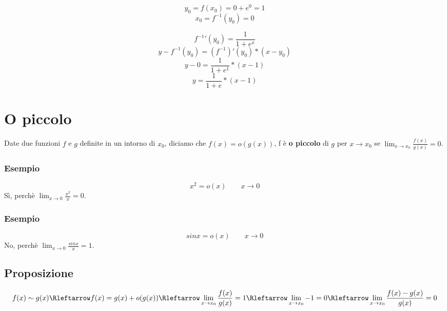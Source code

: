 \documentclass{article}
\begin{document}
\[y_0 = f(x_0) = 0 + e^0 = 1\]
\[x_0 = f^{-1}(y_0) = 0\]

\[f^{-1}'(y_0) = \frac{1}{1 + e^x}\]
\[y - f^{-1}(y_0) = (f^{-1})'(y_0) * (x - y_0)\]
\[y - 0 = \frac{1}{1 + e^{1}} * (x - 1)\]
\[y = \frac{1}{1 + e} * (x - 1)\]

\section{O piccolo}
Date due funzioni \(f\) e \(g\) definite in un intorno di \(x_0\), diciamo che \(f(x) = o(g(x))\), f è \textbf{o piccolo} di \(g\) per \(x \to x_0\) se \(\lim_{x \to x_0} \frac{f(x)}{g(x)} = 0\).

\subsubsection{Esempio}
\[x^2 = o(x) \qquad x \to 0\]
Sì, perchè \(\lim_{x \to 0} \frac{x^2}{x} = 0\).

\subsubsection{Esempio}
\[sin x = o(x) \qquad x \to 0\]
No, perchè \(\lim_{x \to 0} \frac{sin x}{x} = 1\).

\subsection{Proposizione}
\[f(x) \sim g(x) \Rleftarrow f(x) = g(x) + o(g(x)) \Rleftarrow \lim_{x \to x_0} \frac{f(x)}{g(x)} = 1 \Rleftarrow \lim_{x \to x_0} - 1 = 0 \Rleftarrow \lim_{x \to x_0} \frac{f(x) - g(x)}{g(x)} = 0\]
\end{document}
